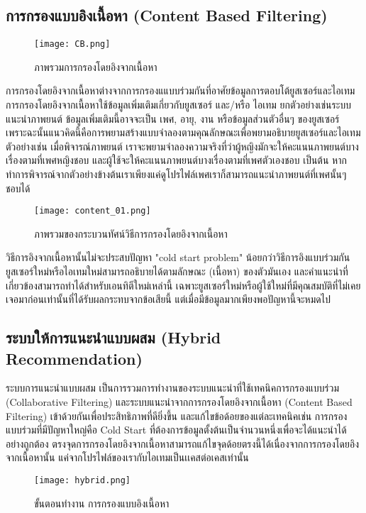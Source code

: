 \subsection{การกรองแบบอิงเนื้อหา (Content Based Filtering)}
\begin{figure}[!h]
  \centering
  \texttt{[image: CB.png]}  
  \caption{ภาพรวมการกรองโดยอิงจากเนื้อหา}
  \label{Fig:cell-and-block}
\end{figure}
การกรองโดยอิงจากเนื้อหาต่างจากการกรองแแบบร่วมกันที่อาศัยข้อมูลการตอบโต้ยูสเซอร์และไอเทม การกรองโดยอิงจากเนื้อหาใช้ข้อมูลเพิ่มเติมเกี่ยวกับยูสเซอร์ และ/หรือ ไอเทม ยกตัวอย่างเช่นระบบแนะนำภาพยนต์ 
ข้อมูลเพิ่มเติมนี้อาจจะเป็น เพศ, อายุ, งาน หรือข้อมูลส่วนตัวอื่นๆ ของยูสเซอร์ เพราะฉะนั้นแนวคิดนี้คือการพยามสร้างแบบจำลองตามคุณลักษณะเพื่อพยามอธิบายยูสเซอร์และไอเทม ตัวอย่างเช่น เมื่อพิจารณ์ภาพยนต์ เราจะพยามจำลองความจริงที่ว่าผู้หญิงมักจะให้คะแนนภาพยนต์บางเรื่องตามที่เพศหญิงชอบ และผู้ใช้จะให้คะแนนภาพยนต์บางเรื่องตามที่เพศตัวเองชอบ เป็นต้น หากทำการพิจารณ์จากตัวอย่างข้างต้นเราเพียงแค่ดูโปรไฟล์เพศเราก็สามารถแนะนำภาพยนต์ที่เพศนั้นๆ ชอบได้
\newline
\begin{figure}[!h]
  \centering
  \texttt{[image: content\_01.png]}  
  \caption{ภาพรวมของกระบวนทัศน์วิธีการกรองโดยอิงจากเนื้อหา}
  \label{Fig:cell-and-block}
\end{figure}
วิธีการอิงจากเนื้อหานั้นไม่จะประสบปัญหา "cold start problem" น้อยกว่าวิธีการอิงแบบร่วมกัน ยูสเซอร์ใหม่หรือไอเทมใหม่สามารถอธิบายได้ตามลักษณะ (เนื้อหา) ของตัวมันเอง และคำแนะนำที่เกี่ยวข้องสามารถทำได้สำหรับเอนทิตีใหม่เหล่านี้ เฉพาะยูสเซอร์ใหม่หรือผู้ใช้ใหม่ที่มีคุณสมบัติที่ไม่เคยเจอมาก่อนเท่านั้นที่ได้รับผลกระทบจากข้อเสียนี้ แต่เมื่อมีข้อมูลมากเพียงพอปัญหานี้จะหมดไป
\pagebreak

\subsection{ระบบให้การแนะนำแบบผสม (Hybrid Recommendation)}
ระบบการแนะนำแบบผสม เป็นการรวมการทำงานของระบบแนะนำที่ใช้เทคนิคการกรองแบบร่วม (Collaborative Filtering) และระบบแนะนำจากการกรองโดยอิงจากเนื้อหา (Content Based Filtering) เข้าด้วยกันเพื่อประสิทธิภาพที่ดียิ่งขึ้น และแก้ไขข้อด้อยของแต่ละเทคนิคเช่น การกรองแบบร่วมที่มีปัญหาใหญ่คือ Cold Start \cite{farshad} ที่ต้องการข้อมูลตั้งต้นเป็นจำนวนหนึ่งเพื่อจะได้แนะนำได้อย่างถูกต้อง ตรงจุดการกรองโดยอิงจากเนื้อหาสามารถแก้ไขจุดด้อยตรงนี้ได้เนื่องจากการกรองโดยอิงจากเนื้อหานั้น แค่จากโปรไฟล์ของเรากับไอเทมเป็นเเคสต่อเคสเท่านั้น
\newline
\begin{figure}[!h]
  \centering
  \texttt{[image: hybrid.png]}  
  \caption{ขั้นตอนทำงาน การกรองแบบอิงเนื้อหา}
  \label{Fig:cell-and-block}
\end{figure}


